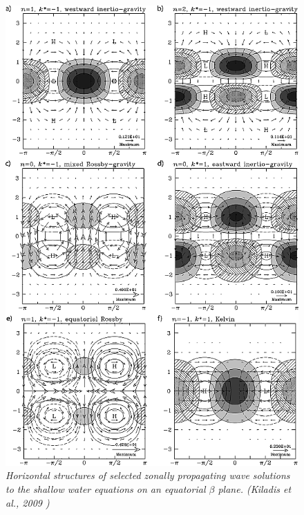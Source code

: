 \begin{figure}[ht!]
    \centering
    \includegraphics[height=0.75\textheight]{graphics/rog1687-fig-0003.png}
    \caption{\textit{Horizontal structures of selected zonally propagating wave solutions to the shallow water equations on an equatorial $\beta$ plane. (Kiladis et al., 2009 \cite{https://doi.org/10.1029/2008RG000266})}}
\end{figure}

